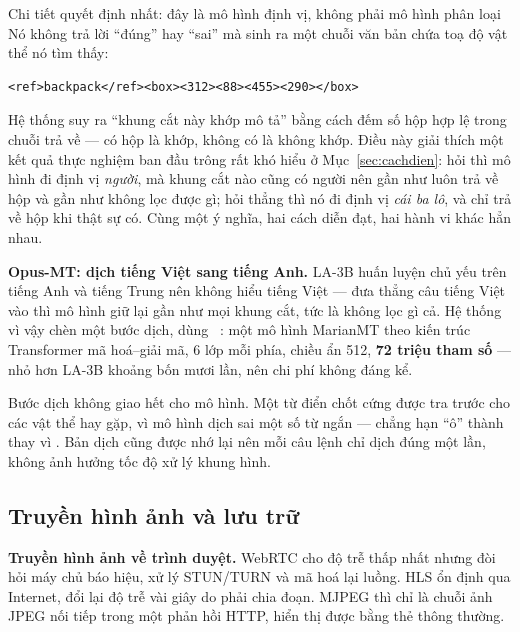 Chi tiết quyết định nhất: đây là mô hình định vị, không phải mô hình phân
loại Nó không trả lời ``đúng'' hay ``sai'' mà sinh ra một chuỗi văn bản chứa toạ độ
vật thể nó tìm thấy:

\begin{lstlisting}[caption={Dạng đầu ra của LA-3B; hệ thống chỉ xét có hộp hợp lệ nào không}]
<ref>backpack</ref><box><312><88><455><290></box>
\end{lstlisting}

Hệ thống suy ra ``khung cắt này khớp mô tả'' bằng cách đếm số hộp hợp lệ trong chuỗi trả
về --- có hộp là khớp, không có là không khớp. Điều này giải thích một kết quả thực
nghiệm ban đầu trông rất khó hiểu ở Mục~\ref{sec:cachdien}: hỏi  thì mô hình đi định vị \emph{người}, mà khung cắt nào cũng có người nên gần
như luôn trả về hộp và gần như không lọc được gì; hỏi thẳng  thì nó đi
định vị \emph{cái ba lô}, và chỉ trả về hộp khi thật sự có. Cùng một ý nghĩa, hai cách
diễn đạt, hai hành vi khác hẳn nhau.

\textbf{Opus-MT: dịch tiếng Việt sang tiếng Anh.} LA-3B huấn luyện chủ yếu trên tiếng
Anh và tiếng Trung nên không hiểu tiếng Việt --- đưa thẳng câu tiếng Việt vào thì mô
hình giữ lại gần như mọi khung cắt, tức là không lọc gì cả. Hệ thống vì vậy chèn một
bước dịch, dùng ~\cite{tiedemann2020opusmt}: một mô hình MarianMT theo kiến trúc
Transformer mã hoá--giải mã, 6 lớp mỗi phía, chiều ẩn 512, \textbf{72 triệu tham số}
--- nhỏ hơn LA-3B khoảng bốn mươi lần, nên chi phí không đáng kể.

Bước dịch không giao hết cho mô hình. Một từ điển chốt cứng được tra trước cho các vật
thể hay gặp, vì mô hình dịch sai một số từ ngắn --- chẳng hạn ``ô'' thành  thay
vì . Bản dịch cũng được nhớ lại nên mỗi câu lệnh chỉ dịch đúng một lần,
không ảnh hưởng tốc độ xử lý khung hình.


\subsection{Truyền hình ảnh và lưu trữ}
\label{sub:truyenanh}

\textbf{Truyền hình ảnh về trình duyệt.} WebRTC cho độ trễ thấp nhất nhưng đòi hỏi máy
chủ báo hiệu, xử lý STUN/TURN và mã hoá lại luồng. HLS ổn định qua Internet, đổi lại độ
trễ vài giây do phải chia đoạn. MJPEG thì chỉ là chuỗi ảnh JPEG nối tiếp trong một phản
hồi HTTP, hiển thị được bằng thẻ  thông thường.


